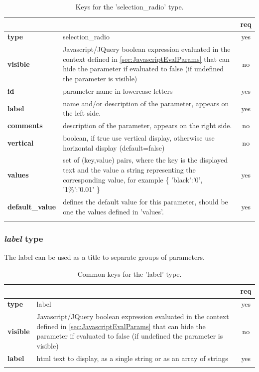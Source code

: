 \begin{longtable}{|>{\bf}L{\linewidth}|L{\linewidth}|c|}
\hline
      &  & {\bf req} 
\tabularnewline \hline \hline
 type     & selection\_radio    & yes \\ \hline
 visible  & Javascript/JQuery boolean expression evaluated in the context defined 
              in \ref{sec:JavascriptEvalParams} that can hide the parameter if
            evaluated to false (if undefined the parameter is visible)& no \\ \hline
 id       & parameter name in lowercase letters & yes \\ \hline
 label  & name and/or description of the parameter, appears on the left side. & yes
                      \\ \hline
 comments & description of the parameter, appears on the right side. & no
                      \\ \hline
 vertical & boolean, if true use vertical display, otherwise use horizontal
            display (default=false) & no \\ \hline
 values   & set of (key,value) pairs, where the key is the displayed text and the 
value a string representing the corresponding value, for example \{ 
'black':'0', '1\%':'0.01' \} & yes
                      \\ \hline
 default\_value & defines the default value for this parameter, should be one 
the values defined in 'values'. & yes \\ \hline
\caption{Keys for the 'selection\_radio' type.}
\end{longtable}

\subsubsection{ \emph{label} type}

The label  can be used as a title to separate groups of parameters.

\begin{longtable}{|>{\bf}L{\linewidth}|L{\linewidth}|c|}
\hline
      &  & {\bf req} 
\tabularnewline \hline \hline
 type  & label       & yes \\ \hline
 visible  & Javascript/JQuery boolean expression evaluated in the context defined 
              in \ref{sec:JavascriptEvalParams} that can hide the parameter if
            evaluated to false (if undefined the parameter is visible)& no \\ \hline
 label & html text to display, as a single string or as an array of strings& yes
                      \\ \hline
\caption{Common keys for the 'label' type.}
\end{longtable}



